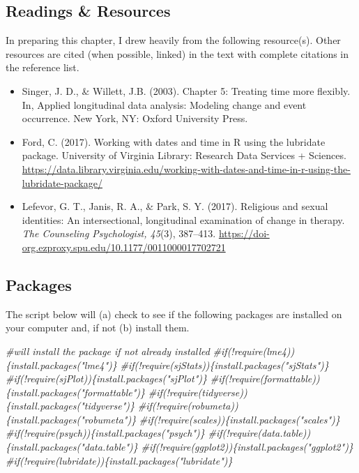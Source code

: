 \documentclass[
  11pt,
]{book}
\newenvironment{Shaded}{\begin{snugshade}}{\end{snugshade}}
\newcommand{\CommentTok}[1]{\textcolor[rgb]{0.56,0.35,0.01}{\textit{#1}}}
\providecommand{\tightlist}{%
  \setlength{\itemsep}{0pt}\setlength{\parskip}{0pt}}
\begin{document}
\hypertarget{readings-resources-3}{%
\subsection{Readings \& Resources}\label{readings-resources-3}}

In preparing this chapter, I drew heavily from the following resource(s). Other resources are cited (when possible, linked) in the text with complete citations in the reference list.

\begin{itemize}
\tightlist
\item
  Singer, J. D., \& Willett, J.B. (2003). Chapter 5: Treating time more flexibly. In, Applied longitudinal data analysis: Modeling change and event occurrence. New York, NY: Oxford University Press.
\item
  Ford, C. (2017). Working with dates and time in R using the lubridate package. University of Virginia Library: Research Data Services + Sciences. \url{https://data.library.virginia.edu/working-with-dates-and-time-in-r-using-the-lubridate-package/}
\item
  Lefevor, G. T., Janis, R. A., \& Park, S. Y. (2017). Religious and sexual identities: An intersectional, longitudinal examination of change in therapy. \emph{The Counseling Psychologist, 45}(3), 387--413. \url{https://doi-org.ezproxy.spu.edu/10.1177/0011000017702721}
\end{itemize}

\hypertarget{packages-4}{%
\subsection{Packages}\label{packages-4}}

The script below will (a) check to see if the following packages are installed on your computer and, if not (b) install them.

\begin{Shaded}
\begin{Highlighting}[]
\CommentTok{\#will install the package if not already installed}
\CommentTok{\#if(!require(lme4))\{install.packages("lme4")\}}
\CommentTok{\#if(!require(sjStats))\{install.packages("sjStats")\}}
\CommentTok{\#if(!require(sjPlot))\{install.packages("sjPlot")\}}
\CommentTok{\#if(!require(formattable))\{install.packages("formattable")\}}
\CommentTok{\#if(!require(tidyverse))\{install.packages("tidyverse")\}}
\CommentTok{\#if(!require(robumeta))\{install.packages("robumeta")\}}
\CommentTok{\#if(!require(scales))\{install.packages("scales")\}}
\CommentTok{\#if(!require(psych))\{install.packages("psych")\}}
\CommentTok{\#if(!require(data.table))\{install.packages("data.table")\}}
\CommentTok{\#if(!require(ggplot2))\{install.packages("ggplot2")\}}
\CommentTok{\#if(!require(lubridate))\{install.packages("lubridate")\}}
\end{Highlighting}
\end{Shaded}
\end{document}

